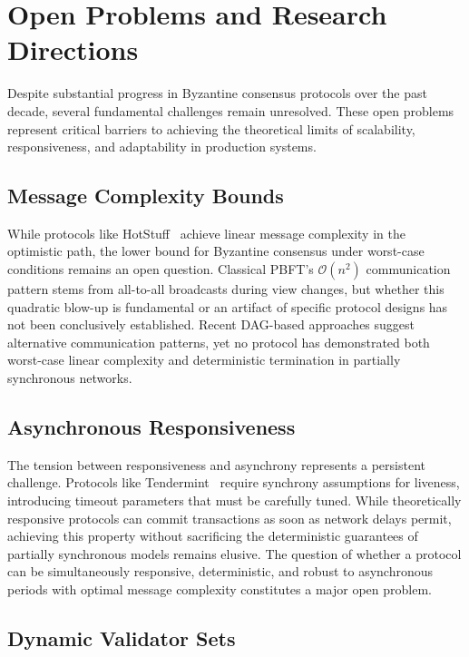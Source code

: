 \section{Open Problems and Research Directions}

Despite substantial progress in Byzantine consensus protocols over the past decade, several fundamental challenges remain unresolved. These open problems represent critical barriers to achieving the theoretical limits of scalability, responsiveness, and adaptability in production systems.

\subsection{Message Complexity Bounds}

While protocols like HotStuff~\cite{yin2019hotstuff} achieve linear message complexity in the optimistic path, the lower bound for Byzantine consensus under worst-case conditions remains an open question. Classical PBFT's $\mathcal{O}(n^2)$ communication pattern stems from all-to-all broadcasts during view changes, but whether this quadratic blow-up is fundamental or an artifact of specific protocol designs has not been conclusively established. Recent DAG-based approaches suggest alternative communication patterns, yet no protocol has demonstrated both worst-case linear complexity and deterministic termination in partially synchronous networks.

\subsection{Asynchronous Responsiveness}

The tension between responsiveness and asynchrony represents a persistent challenge. Protocols like Tendermint~\cite{buchman2016tendermint} require synchrony assumptions for liveness, introducing timeout parameters that must be carefully tuned. While theoretically responsive protocols can commit transactions as soon as network delays permit, achieving this property without sacrificing the deterministic guarantees of partially synchronous models remains elusive. The question of whether a protocol can be simultaneously responsive, deterministic, and robust to asynchronous periods with optimal message complexity constitutes a major open problem.

\subsection{Dynamic Validator Sets}

